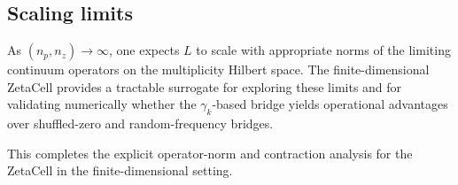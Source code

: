 \documentclass[11pt]{article}
\theoremstyle{definition}
\theoremstyle{plain}
\begin{document}
\subsection{Scaling limits}

As $(n_p,n_z)\to\infty$, one expects $L$ to scale with appropriate norms of the limiting continuum operators on the multiplicity Hilbert space.
The finite-dimensional ZetaCell provides a tractable surrogate for exploring these limits and for validating numerically whether the $\gamma_k$-based bridge yields operational advantages over shuffled-zero and random-frequency bridges.

\bigskip

This completes the explicit operator-norm and contraction analysis for the ZetaCell in the finite-dimensional setting.

\nocite{*}


\end{document}

